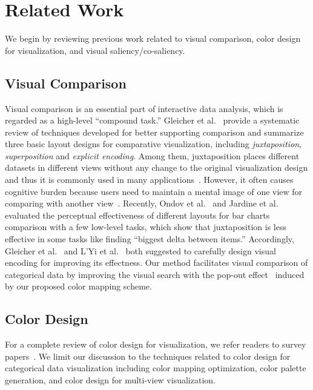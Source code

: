 \section {Related Work}
We begin by reviewing previous work related to visual comparison, color design for visualization, and
visual saliency/co-saliency.


\subsection{Visual Comparison}
Visual comparison is an essential part of interactive data analysis, which is regarded as a high-level ``compound task.'' Gleicher et al.~\cite{Gleicher11} provide a systematic review of techniques developed for better supporting comparison and summarize three basic layout designs for comparative visualization, including \emph{juxtaposition}, \emph{superposition} and \emph{explicit encoding}. Among them, juxtaposition places different datasets in different views without any change to the original visualization design and thus it is commonly used in many applications~\cite{munzner2003treejuxtaposer,Albers11,Lobo15}. However, it often causes cognitive burden because users need to maintain a mental image of one view for comparing with another view~\cite{LYi21}. Recently, Ondov et al.~\cite{Ondov19} and Jardine et al.~\cite{jardine2019perceptual} evaluated the perceptual effectiveness of different layouts for bar charts comparison with a few low-level tasks, which show that juxtaposition is less effective in some tasks like finding ``biggest delta between items.''
Accordingly, Gleicher et al.~\cite{Gleicher11} and  L'Yi et al.~\cite{LYi21} both suggested to carefully design visual encoding for improving its effectness. Our method facilitates visual comparison of categorical data by improving the visual search with the pop-out effect~\cite{enns1990three} induced by our proposed color mapping scheme.


\subsection{Color Design}
For a complete review of color design for visualization, we refer readers to survey papers~\cite{Tominski08,Zhou16}. We limit our discussion to the techniques related to color design for categorical data visualization including color mapping optimization, color palette generation, and color design for multi-view visualization.

